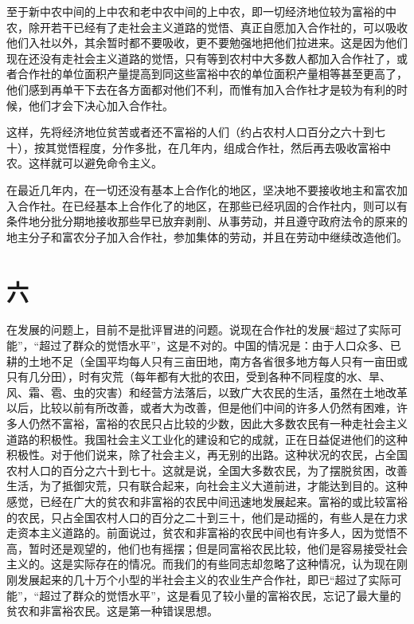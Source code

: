 至于新中农中间的上中农和老中农中间的上中农，即一切经济地位较为富裕的中农，除开若干已经有了走社会主义道路的觉悟、真正自愿加入合作社的，可以吸收他们入社以外，其余暂时都不要吸收，更不要勉强地把他们拉进来。这是因为他们现在还没有走社会主义道路的觉悟，只有等到农村中大多数人都加入合作社了，或者合作社的单位面积产量提高到同这些富裕中农的单位面积产量相等甚至更高了，他们感到再单干下去在各方面都对他们不利，而惟有加入合作社才是较为有利的时候，他们才会下决心加入合作社。

这样，先将经济地位贫苦或者还不富裕的人们（约占农村人口百分之六十到七十），按其觉悟程度，分作多批，在几年内，组成合作社，然后再去吸收富裕中农。这样就可以避免命令主义。

在最近几年内，在一切还没有基本上合作化的地区，坚决地不要接收地主和富农加入合作社。在已经基本上合作化了的地区，在那些已经巩固的合作社内，则可以有条件地分批分期地接收那些早已放弃剥削、从事劳动，并且遵守政府法令的原来的地主分子和富农分子加入合作社，参加集体的劳动，并且在劳动中继续改造他们。

\section*{六}

在发展的问题上，目前不是批评冒进的问题。说现在合作社的发展“超过了实际可能”，“超过了群众的觉悟水平”，这是不对的。中国的情况是：由于人口众多、已耕的土地不足（全国平均每人只有三亩田地，南方各省很多地方每人只有一亩田或只有几分田），时有灾荒（每年都有大批的农田，受到各种不同程度的水、旱、风、霜、雹、虫的灾害）和经营方法落后，以致广大农民的生活，虽然在土地改革以后，比较以前有所改善，或者大为改善，但是他们中间的许多人仍然有困难，许多人仍然不富裕，富裕的农民只占比较的少数，因此大多数农民有一种走社会主义道路的积极性。我国社会主义工业化的建设和它的成就，正在日益促进他们的这种积极性。对于他们说来，除了社会主义，再无别的出路。这种状况的农民，占全国农村人口的百分之六十到七十。这就是说，全国大多数农民，为了摆脱贫困，改善生活，为了抵御灾荒，只有联合起来，向社会主义大道前进，才能达到目的。这种感觉，已经在广大的贫农和非富裕的农民中间迅速地发展起来。富裕的或比较富裕的农民，只占全国农村人口的百分之二十到三十，他们是动摇的，有些人是在力求走资本主义道路的。前面说过，贫农和非富裕的农民中间也有许多人，因为觉悟不高，暂时还是观望的，他们也有摇摆；但是同富裕农民比较，他们是容易接受社会主义的。这是实际存在的情况。而我们的有些同志却忽略了这种情况，认为现在刚刚发展起来的几十万个小型的半社会主义的农业生产合作社，即已“超过了实际可能”，“超过了群众的觉悟水平”，这是看见了较小量的富裕农民，忘记了最大量的贫农和非富裕农民。这是第一种错误思想。

